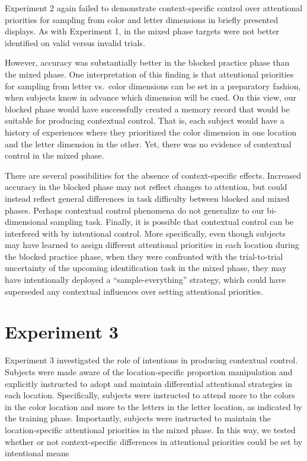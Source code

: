 \documentclass[english,,man,floatsintext]{apa6}
\begin{document}
Experiment 2 again failed to demonstrate context-specific control over
attentional priorities for sampling from color and letter dimensions in
briefly presented displays. As with Experiment 1, in the mixed phase
targets were not better identified on valid versus invalid trials.

However, accuracy was substantially better in the blocked practice phase
than the mixed phase. One interpretation of this finding is that
attentional priorities for sampling from letter vs.~color dimensions can
be set in a preparatory fashion, when subjects know in advance which
dimension will be cued. On this view, our blocked phase would have
successfully created a memory record that would be suitable for
producing contextual control. That is, each subject would have a history
of experiences where they prioritized the color dimension in one
location and the letter dimension in the other. Yet, there was no
evidence of contextual control in the mixed phase.

There are several possibilities for the absence of context-specific
effects. Increased accuracy in the blocked phase may not reflect changes
to attention, but could instead reflect general differences in task
difficulty between blocked and mixed phases. Perhaps contextual control
phenomena do not generalize to our bi-dimensional sampling task.
Finally, it is possible that contextual control can be interfered with
by intentional control. More specifically, even though subjects may have
learned to assign different attentional priorities in each location
during the blocked practice phase, when they were confronted with the
trial-to-trial uncertainty of the upcoming identification task in the
mixed phase, they may have intentionally deployed a
\enquote{sample-everything} strategy, which could have superseded any
contextual influences over setting attentional priorities.

\section{Experiment 3}\label{experiment-3}

Experiment 3 investigated the role of intentions in producing contextual
control. Subjects were made aware of the location-specific proportion
manipulation and explicitly instructed to adopt and maintain
differential attentional strategies in each location. Specifically,
subjects were instructed to attend more to the colors in the color
location and more to the letters in the letter location, as indicated by
the training phase. Importantly, subjects were instructed to maintain
the location-specific attentional priorities in the mixed phase. In this
way, we tested whether or not context-specific differences in
attentional priorities could be set by intentional means
\end{document}
